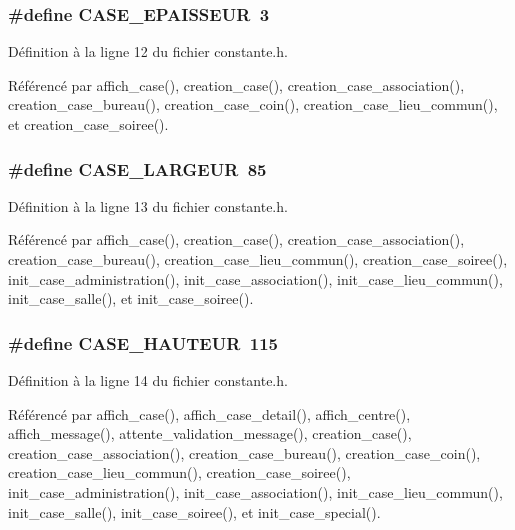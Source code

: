 \subsubsection{\setlength{\rightskip}{0pt plus 5cm}\#define CASE\_\-EPAISSEUR~3}\label{constante_8h_e8f228ba55e887aaba7457af81d99371}




D\'{e}finition \`{a} la ligne 12 du fichier constante.h.

R\'{e}f\'{e}renc\'{e} par affich\_\-case(), creation\_\-case(), creation\_\-case\_\-association(), creation\_\-case\_\-bureau(), creation\_\-case\_\-coin(), creation\_\-case\_\-lieu\_\-commun(), et creation\_\-case\_\-soiree().
\subsubsection{\setlength{\rightskip}{0pt plus 5cm}\#define CASE\_\-LARGEUR~85}\label{constante_8h_62bc435c0b1a7228eaf5fd6b4c3ec6dd}




D\'{e}finition \`{a} la ligne 13 du fichier constante.h.

R\'{e}f\'{e}renc\'{e} par affich\_\-case(), creation\_\-case(), creation\_\-case\_\-association(), creation\_\-case\_\-bureau(), creation\_\-case\_\-lieu\_\-commun(), creation\_\-case\_\-soiree(), init\_\-case\_\-administration(), init\_\-case\_\-association(), init\_\-case\_\-lieu\_\-commun(), init\_\-case\_\-salle(), et init\_\-case\_\-soiree().
\subsubsection{\setlength{\rightskip}{0pt plus 5cm}\#define CASE\_\-HAUTEUR~115}\label{constante_8h_15523f030fdd5317a36ef19332d80b8c}




D\'{e}finition \`{a} la ligne 14 du fichier constante.h.

R\'{e}f\'{e}renc\'{e} par affich\_\-case(), affich\_\-case\_\-detail(), affich\_\-centre(), affich\_\-message(), attente\_\-validation\_\-message(), creation\_\-case(), creation\_\-case\_\-association(), creation\_\-case\_\-bureau(), creation\_\-case\_\-coin(), creation\_\-case\_\-lieu\_\-commun(), creation\_\-case\_\-soiree(), init\_\-case\_\-administration(), init\_\-case\_\-association(), init\_\-case\_\-lieu\_\-commun(), init\_\-case\_\-salle(), init\_\-case\_\-soiree(), et init\_\-case\_\-special().
